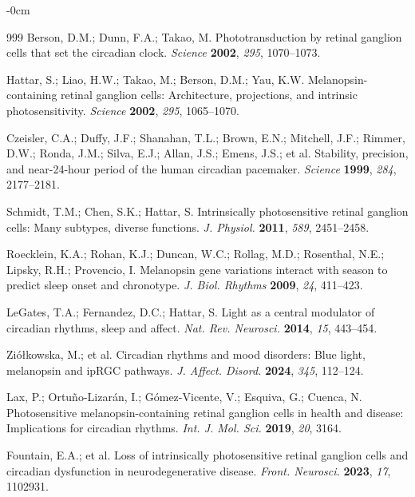 \documentclass[brainsci,article,submit,moreauthors]{Definitions/mdpi}
\begin{document}
\begin{adjustwidth}{-\extralength}{0cm}
\begin{thebibliography}{999}
Berson, D.M.; Dunn, F.A.; Takao, M. Phototransduction by retinal ganglion cells that set the circadian clock. \textit{Science} \textbf{2002}, \textit{295}, 1070--1073.

Hattar, S.; Liao, H.W.; Takao, M.; Berson, D.M.; Yau, K.W. Melanopsin-containing retinal ganglion cells: Architecture, projections, and intrinsic photosensitivity. \textit{Science} \textbf{2002}, \textit{295}, 1065--1070.

Czeisler, C.A.; Duffy, J.F.; Shanahan, T.L.; Brown, E.N.; Mitchell, J.F.; Rimmer, D.W.; Ronda, J.M.; Silva, E.J.; Allan, J.S.; Emens, J.S.; et al. Stability, precision, and near-24-hour period of the human circadian pacemaker. \textit{Science} \textbf{1999}, \textit{284}, 2177--2181.

Schmidt, T.M.; Chen, S.K.; Hattar, S. Intrinsically photosensitive retinal ganglion cells: Many subtypes, diverse functions. \textit{J. Physiol.} \textbf{2011}, \textit{589}, 2451--2458.

Roecklein, K.A.; Rohan, K.J.; Duncan, W.C.; Rollag, M.D.; Rosenthal, N.E.; Lipsky, R.H.; Provencio, I. Melanopsin gene variations interact with season to predict sleep onset and chronotype. \textit{J. Biol. Rhythms} \textbf{2009}, \textit{24}, 411--423.

LeGates, T.A.; Fernandez, D.C.; Hattar, S. Light as a central modulator of circadian rhythms, sleep and affect. \textit{Nat. Rev. Neurosci.} \textbf{2014}, \textit{15}, 443--454.

Zi\'o{\l}kowska, M.; et al. Circadian rhythms and mood disorders: Blue light, melanopsin and ipRGC pathways. \textit{J. Affect. Disord.} \textbf{2024}, \textit{345}, 112--124.

Lax, P.; Ortu\~no-Lizar\'an, I.; G\'omez-Vicente, V.; Esquiva, G.; Cuenca, N. Photosensitive melanopsin-containing retinal ganglion cells in health and disease: Implications for circadian rhythms. \textit{Int. J. Mol. Sci.} \textbf{2019}, \textit{20}, 3164.

Fountain, E.A.; et al. Loss of intrinsically photosensitive retinal ganglion cells and circadian dysfunction in neurodegenerative disease. \textit{Front. Neurosci.} \textbf{2023}, \textit{17}, 1102931.

\end{thebibliography}

\PublishersNote{}
\end{adjustwidth}
\end{document}
